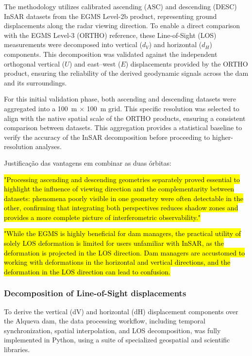 \documentclass[11pt,a4paper]{article}
\begin{document}
The methodology utilizes calibrated ascending (ASC) and descending (DESC) InSAR datasets from the EGMS Level-2b product, representing ground displacements along the radar viewing direction. To enable a direct comparison with the EGMS Level-3 (ORTHO) reference, these Line-of-Sight (LOS) measurements were decomposed into vertical ($d_V$) and horizontal ($d_H$) components. This decomposition was validated against the independent orthogonal vertical ($U$) and east–west ($E$) displacements provided by the ORTHO product, ensuring the reliability of the derived geodynamic signals across the dam and its surroundings.

For this initial validation phase, both ascending and descending datasets were aggregated into a 100~m $\times$ 100~m grid. This specific resolution was selected to align with the native spatial scale of the ORTHO products, ensuring a consistent comparison between datasets. This aggregation provides a statistical baseline to verify the accuracy of the InSAR decomposition before proceeding to higher-resolution analyses.

Justificação das vantagens em combinar as duas órbitas:

\hl{\mbox{\parencite{cernuto2026}} "Processing ascending and descending geometries separately proved essential to highlight the influence of viewing direction and the complementarity between datasets: phenomena poorly visible in one geometry were often detectable in the other, confirming that integrating both perspectives reduces shadow zones and provides a more complete picture of interferometric observability."}

\hl{\mbox{\parencite{ruiz-armenteros2023}} "While the EGMS is highly beneficial for dam managers, the practical utility of solely LOS deformation is limited for users unfamiliar with InSAR, as the deformation is projected in the LOS direction. Dam managers are accustomed to working with deformations in the horizontal and vertical directions, and the deformation in the LOS direction can lead to confusion.}

\subsubsection{Decomposition of Line-of-Sight displacements}

To derive the vertical (dV) and horizontal (dH) displacement components over the Alqueva dam, the data processing workflow, including temporal synchronization, spatial interpolation, and LOS decomposition, was fully implemented in Python, using a suite of specialized geospatial and scientific libraries.
\end{document}
